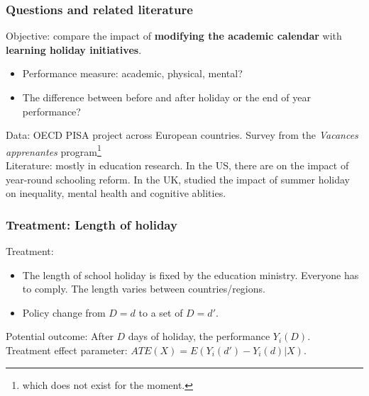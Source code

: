 \documentclass[10pt,mathserif,aspectratio=169]{beamer}
\begin{document}

\begin{frame}[label=questions]
  \frametitle{Questions and related literature}
  \alert{Objective}: compare the impact of \textbf{modifying the academic calendar} with \textbf{learning holiday initiatives}.
  \begin{itemize}
    \item Performance measure: academic, physical, mental?
    \item The difference between before and after holiday or the end of year performance?
  \end{itemize}
  \alert{Data}: OECD PISA project across European countries. Survey from the \textit{Vacances apprenantes} program\footnote{which does not exist for the moment.}\\
  \alert{Literature}: mostly in education research. In the US, there are \citet{cooper2003effects, mcmullen2012impact} on the impact of year-round schooling reform. In the UK, \citet{kromydas2022effect,morgan2019socio} studied the impact of summer holiday on inequality, mental health and cognitive ablities.
\end{frame}

\begin{frame}[label=holidaylength]
  \frametitle{Treatment: Length of holiday}
  \alert{Treatment}:
  \begin{itemize}
    \item The length of school holiday is fixed by the education ministry. Everyone has
          to comply. The length varies between countries/regions.
    \item  Policy change from $D=d$ to a set of $D=d'$.
  \end{itemize}
  \alert{Potential outcome}:
  After $D$ days of holiday, the performance $Y_{i}(D)$.\\
  \alert{Treatment effect parameter}: $ATE(X)= E(Y_i(d')-Y_i(d)|X)$.

\end{frame}
\end{document}
